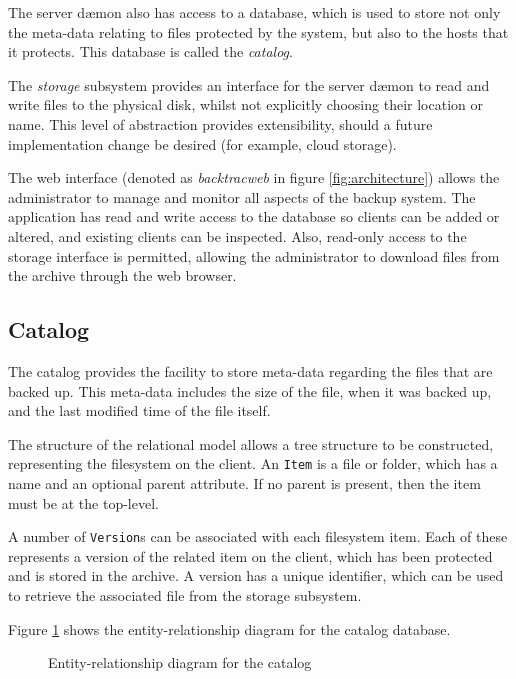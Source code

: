 The server d{\ae}mon also has access to a database, which is used to store not
only the meta-data relating to files protected by the system, but also to the
hosts that it protects. This database is called the \emph{catalog}.

The \emph{storage} subsystem provides an interface for the server d{\ae}mon to
read and write files to the physical disk, whilst not explicitly choosing their
location or name. This level of abstraction provides extensibility, should
a future implementation change be desired (for example, cloud storage).

The web interface (denoted as \emph{backtracweb} in figure
\ref{fig:architecture}) allows the administrator to manage and monitor all
aspects of the backup system. The application has read and write access to the
database so clients can be added or altered, and existing clients can be
inspected. Also, read-only access to the storage interface is permitted,
allowing the administrator to download files from the archive through the web
browser.

\subsection{Catalog}

The catalog provides the facility to store meta-data regarding the files that
are backed up. This meta-data includes the size of the file, when it was backed
up, and the last modified time of the file itself.

The structure of the relational model allows a tree structure to be
constructed, representing the filesystem on the client. An \verb!Item! is
a file or folder, which has a name and an optional parent attribute. If no
parent is present, then the item must be at the top-level.

A number of \verb!Version!s can be associated with each filesystem item. Each
of these represents a version of the related item on the client, which has been
protected and is stored in the archive. A version has a unique identifier,
which can be used to retrieve the associated file from the storage subsystem.

Figure \ref{fig:erd} shows the entity-relationship diagram for the catalog
database.

\begin{figure}
    \begin{center}
        
    \end{center}
    \caption{Entity-relationship diagram for the catalog}
    \label{fig:erd}
\end{figure}

